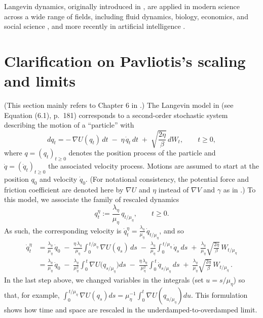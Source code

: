 \documentclass[12pt]{article}
\numberwithin{equation}{section}
\theoremstyle{remark}
\begin{document}
Langevin dynamics, originally introduced in \cite{Langevin1908}, are applied in modern science across a wide range of fields, including fluid dynamics, biology, economics, and social science \cite{Naldi2010,Pareschi2013}, and more recently in artificial intelligence \cite{Cheng2018}.

\section{Clarification on Pavliotis's scaling and limits}

(This section mainly refers to Chapter 6 in \cite{Pavliotis2014}.) The Langevin model in \cite{Pavliotis2014} (see Equation (6.1), p. 181) corresponds to a second-order stochastic system describing the motion of a “particle” with 
\[ 
dq_t = -\,\nabla U(q_t)\,dt \;-\; \eta\,\dot{q}_t\,dt \;+\; \sqrt{\frac{2\eta}{\beta}}\,dW_t, \qquad t \ge 0, 
\] 
where $q = (q_t)_{t\ge0}$ denotes the position process of the particle and $\dot{q} = (\dot{q}_t)_{t\ge0}$ the associated velocity process. Motions are assumed to start at the position $q_0$ and velocity $\dot{q}_0$. (For notational consistency, the potential force and friction coefficient are denoted here by $\nabla U$ and $\eta$ instead of $\nabla V$ and $\gamma$ as in \cite{Pavliotis2014}.) To this model, we associate the family of rescaled dynamics 
\[ 
q_t^\eta := \frac{\lambda_\eta}{\mu_\eta}\,q_{t/\mu_\eta}, \qquad t \ge 0. 
\] 
As such, the corresponding velocity is $\dot{q}_t^\eta = \frac{\lambda_\eta}{\mu_\eta}\,\dot{q}_{t/\mu_\eta}$, and so 
\begin{align*}
\dot{q}_t^\eta &= \frac{\lambda_\eta}{\mu_\eta}\,\dot{q}_0 \;-\; \frac{\eta\,\lambda_\eta}{\mu_\eta}\int_{0}^{\,t/\mu_\eta} \nabla U(q_s)\,ds \;-\; \frac{\lambda_\eta}{\mu_\eta}\int_{0}^{\,t/\mu_\eta} \dot{q}_s\,ds \;+\; \frac{\lambda_\eta}{\mu_\eta}\sqrt{\frac{2\eta}{\beta}}\,W_{t/\mu_\eta} \\[6pt]
&= \frac{\lambda_\eta}{\mu_\eta}\,\dot{q}_0 \;-\; \frac{\lambda_\eta}{\mu_\eta^2}\int_{0}^{\,t} \nabla U\!\big(q_{s/\mu_\eta}\big)ds \;-\; \frac{\eta\,\lambda_\eta}{\mu_\eta^2}\int_{0}^{\,t} \dot{q}_{s/\mu_\eta}\,ds \;+\; \frac{\lambda_\eta}{\mu_\eta}\sqrt{\frac{2\eta}{\beta}}\,W_{t/\mu_\eta}\,. 
\end{align*}
In the last step above, we changed variables in the integrals (set $u = s/\mu_\eta$) so that, for example, $\int_0^{\,t/\mu_\eta}\nabla U(q_s)ds = \mu_\eta^{-1}\int_0^t \nabla U(q_{u/\mu_\eta})du$. This formulation shows how time and space are rescaled in the underdamped-to-overdamped limit.
\end{document}
